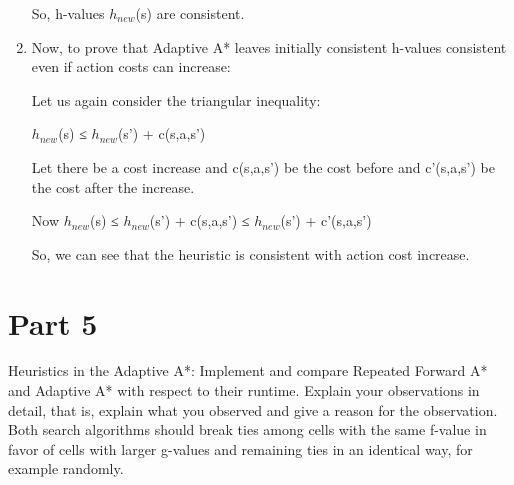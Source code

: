 \documentclass[12pt]{article}
\begin{document}
\begin{enumerate}[label=\alph*]
\begin{flushleft}
So, h-values $h_{new}$(s) are consistent.

\end{flushleft}

\item
\begin{flushleft}


\begin{itshape}
Now, to prove that Adaptive A* leaves initially consistent h-values consistent even if action costs can increase:
\end{itshape}

Let us again consider the triangular inequality:

$h_{new}$(s) ≤ $h_{new}$(s') + c(s,a,s’)

Let there be a cost increase and c(s,a,s’)  be the cost before and c’(s,a,s’) be the cost
after the increase.

Now $h_{new}$(s) ≤  $h_{new}$(s') + c(s,a,s’)  ≤  $h_{new}$(s') + c’(s,a,s’)  

So, we can see that the heuristic is consistent with action cost increase.
        
    \end{flushleft}
   \end{enumerate}
\section*{Part 5}
\begin{itshape}
Heuristics in the Adaptive A*: Implement and compare Repeated Forward A* and Adaptive A*
with respect to their runtime. Explain your observations in detail, that is, explain what you observed and give a reason for
the observation. Both search algorithms should break ties among cells with the same f-value in favor of cells with larger
g-values and remaining ties in an identical way, for example randomly.
\end{itshape}
\end{document}
